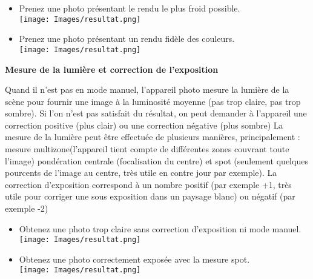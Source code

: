 \documentclass[10pt,fleqn]{article} %
\begin{document}
\begin{itemize}
\item Prenez une photo présentant le rendu le plus froid possible.
\\ \texttt{[image: Images/resultat.png]}
\item Prenez une photo présentant un rendu fidèle des couleurs.
\\ \texttt{[image: Images/resultat.png]}
\end{itemize}

\begin{defi}
\textbf{Mesure de la lumière et correction de l’exposition}

Quand il n’est pas en mode manuel, l’appareil photo mesure la lumière de la scène pour fournir une image à la luminosité moyenne (pas trop claire, pas trop sombre). Si l’on n’est pas satisfait du résultat, on peut demander à l’appareil une correction positive (plus clair) ou une correction négative (plus sombre)
La mesure de la lumière peut être effectuée de plusieurs manières, principalement : mesure multizone(l’appareil tient compte de différentes zones couvrant toute l’image) pondération centrale (focalisation du centre) et spot (seulement quelques pourcents de l’image au centre, très utile en contre jour par exemple). La correction d’exposition correspond à un nombre positif (par exemple +1, très utile pour corriger une sous exposition dans un paysage blanc) ou négatif (par exemple -2)

\end{defi}


\begin{itemize}
\item Obtenez une photo trop claire sans correction d’exposition ni mode manuel.
\\ \texttt{[image: Images/resultat.png]}
\item Obtenez une photo correctement exposée avec la mesure spot.
\\ \texttt{[image: Images/resultat.png]}
\end{itemize}
\end{document}
